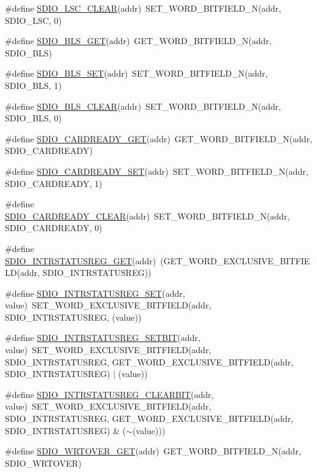 \begin{DoxyCompactItemize}
\item 
\#define \hyperlink{a00570_a8befda210246d8abc41ee21c3ebb8a7c}{SDIO\_\-LSC\_\-CLEAR}(addr)~SET\_\-WORD\_\-BITFIELD\_\-N(addr, SDIO\_\-LSC, 0)
\item 
\#define \hyperlink{a00570_a0a6a525c837dbabecbf435f4355fd648}{SDIO\_\-BLS\_\-GET}(addr)~GET\_\-WORD\_\-BITFIELD\_\-N(addr, SDIO\_\-BLS)
\item 
\#define \hyperlink{a00570_a6f7e5bdc6df797023108694cf982a97b}{SDIO\_\-BLS\_\-SET}(addr)~SET\_\-WORD\_\-BITFIELD\_\-N(addr, SDIO\_\-BLS, 1)
\item 
\#define \hyperlink{a00570_a1c93e0559c5854688d5eac94d9ac22a7}{SDIO\_\-BLS\_\-CLEAR}(addr)~SET\_\-WORD\_\-BITFIELD\_\-N(addr, SDIO\_\-BLS, 0)
\item 
\#define \hyperlink{a00570_a59bf7bcfc2e0bfcafa562c8753d5e22a}{SDIO\_\-CARDREADY\_\-GET}(addr)~GET\_\-WORD\_\-BITFIELD\_\-N(addr, SDIO\_\-CARDREADY)
\item 
\#define \hyperlink{a00570_a7117adc5790a250207ed5db4a75af0df}{SDIO\_\-CARDREADY\_\-SET}(addr)~SET\_\-WORD\_\-BITFIELD\_\-N(addr, SDIO\_\-CARDREADY, 1)
\item 
\#define \hyperlink{a00570_a996c129198815dc913fc11a275105cb0}{SDIO\_\-CARDREADY\_\-CLEAR}(addr)~SET\_\-WORD\_\-BITFIELD\_\-N(addr, SDIO\_\-CARDREADY, 0)
\item 
\#define \hyperlink{a00570_a210c6d473a0d76355d5608581054f523}{SDIO\_\-INTRSTATUSREG\_\-GET}(addr)~(GET\_\-WORD\_\-EXCLUSIVE\_\-BITFIELD(addr, SDIO\_\-INTRSTATUSREG))
\item 
\#define \hyperlink{a00570_a702d511898eca228f67bee021b472052}{SDIO\_\-INTRSTATUSREG\_\-SET}(addr, value)~SET\_\-WORD\_\-EXCLUSIVE\_\-BITFIELD(addr, SDIO\_\-INTRSTATUSREG, (value))
\item 
\#define \hyperlink{a00570_a48dae6de24b4eb379ca33ab4dfe9aaa2}{SDIO\_\-INTRSTATUSREG\_\-SETBIT}(addr, value)~SET\_\-WORD\_\-EXCLUSIVE\_\-BITFIELD(addr, SDIO\_\-INTRSTATUSREG, GET\_\-WORD\_\-EXCLUSIVE\_\-BITFIELD(addr, SDIO\_\-INTRSTATUSREG) $|$ (value))
\item 
\#define \hyperlink{a00570_af810a4bb736cc242aa9be66165f6d9d7}{SDIO\_\-INTRSTATUSREG\_\-CLEARBIT}(addr, value)~SET\_\-WORD\_\-EXCLUSIVE\_\-BITFIELD(addr, SDIO\_\-INTRSTATUSREG, GET\_\-WORD\_\-EXCLUSIVE\_\-BITFIELD(addr, SDIO\_\-INTRSTATUSREG) \& ($\sim$(value)))
\item 
\#define \hyperlink{a00570_a167f655309af12e2ae264c0f49882837}{SDIO\_\-WRTOVER\_\-GET}(addr)~GET\_\-WORD\_\-BITFIELD\_\-N(addr, SDIO\_\-WRTOVER)
\item 

\end{DoxyCompactItemize}
